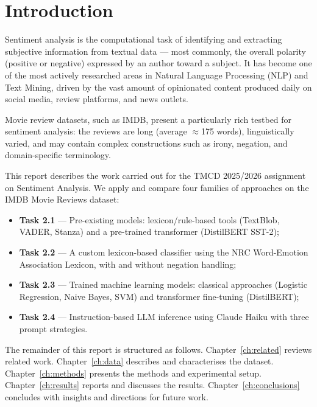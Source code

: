 \documentclass[12pt,reqno,twoside]{amsbook}
\theoremstyle{plain}
\numberwithin{equation}{chapter}
\numberwithin{section}{chapter}
\begin{document}
\chapter{Introduction}

\noindent Sentiment analysis is the computational task of identifying and extracting
subjective information from textual data --- most commonly, the overall polarity
(positive or negative) expressed by an author toward a subject.
It has become one of the most actively researched areas in Natural Language
Processing (NLP) and Text Mining, driven by the vast amount of opinionated content
produced daily on social media, review platforms, and news outlets.

Movie review datasets, such as IMDB, present a particularly rich testbed for
sentiment analysis: the reviews are long (average $\approx$175 words),
linguistically varied, and may contain complex constructions such as irony,
negation, and domain-specific terminology.

This report describes the work carried out for the TMCD 2025/2026 assignment on
Sentiment Analysis.
We apply and compare four families of approaches on the IMDB Movie Reviews dataset:

\begin{itemize}[noitemsep]
  \item \textbf{Task 2.1} --- Pre-existing models: lexicon/rule-based tools
        (TextBlob, VADER, Stanza) and a pre-trained transformer (DistilBERT SST-2);
  \item \textbf{Task 2.2} --- A custom lexicon-based classifier using the NRC
        Word-Emotion Association Lexicon, with and without negation handling;
  \item \textbf{Task 2.3} --- Trained machine learning models: classical approaches
        (Logistic Regression, Naive Bayes, SVM) and transformer fine-tuning
        (DistilBERT);
  \item \textbf{Task 2.4} --- Instruction-based LLM inference using Claude Haiku
        with three prompt strategies.
\end{itemize}

\noindent The remainder of this report is structured as follows.
Chapter~\ref{ch:related} reviews related work.
Chapter~\ref{ch:data} describes and characterises the dataset.
Chapter~\ref{ch:methods} presents the methods and experimental setup.
Chapter~\ref{ch:results} reports and discusses the results.
Chapter~\ref{ch:conclusions} concludes with insights and directions for future work.
\end{document}
